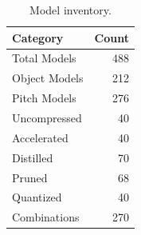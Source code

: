 \begin{table}[H]
\centering
\small
\caption{Model inventory.}
\label{tab:inventory_summary}
\begin{tabular}{l r}
\toprule
\textbf{Category} & \textbf{Count} \\
\midrule
Total Models & 488 \\
Object Models & 212 \\
Pitch Models & 276 \\
\midrule
Uncompressed & 40 \\
Accelerated & 40 \\
Distilled & 70 \\
Pruned & 68 \\
Quantized & 40 \\
Combinations & 270 \\
\bottomrule
\end{tabular}
\end{table}
